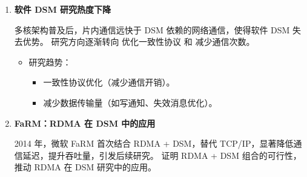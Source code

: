 {\begin{enumerate}[leftmargin=1em, align=left]
          \begin{itemize}
            \item \textbf{顺序一致性}： 1986 年，Li Kai 博士在论文\citep{likai1986svm} 中验证了在分布式系统上构建共享虚拟内存（SVM）的可行性，并开发了首个软件 DSM 系统 IVY\citep{likai1988ivy}。
                  IVY 采用 页粒度共享，支持 SWMR 访问模式，通过 顺序一致性 保持数据一致性，在并行计算中取得良好加速效果。
            \item \textbf{释放一致性(急切更新)}： Munin\citep{bennett1990munin} 采用 释放一致性（RC），仅在特定同步点执行一致性操作，降低通信开销。
                  同时，它使用 数据类型特定一致性模型，结合 多写协议 与 延迟更新机制，有效缓解假共享问题。
            \item \textbf{释放一致性(懒惰更新)}： TreadMarks\citep{amza1996treadmarks} 提出 懒惰更新释放一致性（LRC），
                  相比 Munin 的急切更新，仅在锁的最后释放者和新获取者之间传播一致性消息，从而减少通信量。
            \item \textbf{域一致性}： JIAJIA\citep{huweiwu2001sma} 采用 域一致性（SC），比 LRC 更宽松，仅同步锁保护区域的修改。
                  其 基于锁的缓存一致性协议 用锁存储写通知，而非目录，减少管理复杂性，提升可扩展性。
          \end{itemize}

    \item \textbf{软件 DSM 研究热度下降}

          多核架构普及后，片内通信远快于 DSM 依赖的网络通信，使得软件 DSM 失去优势。
          研究方向逐渐转向 优化一致性协议 和 减少通信次数\citep{Cheung1999AMP, abe2003movinghomedsm}。
          \begin{itemize}
            \item 研究趋势：
                  \begin{itemize}
                    \item 一致性协议优化（减少通信开销）。
                    \item 减少数据传输量（如写通知、失效消息优化）。
                  \end{itemize}
          \end{itemize}

    \item \textbf{FaRM：RDMA 在 DSM 中的应用}

          2014 年，微软 FaRM\citep{drago2014farm} 首次结合 RDMA + DSM，替代 TCP/IP，显著降低通信延迟，提升吞吐量，引发后续研究。
          证明 RDMA + DSM 组合的可行性，推动 RDMA 在 DSM 研究中的应用。


\end{enumerate}}
